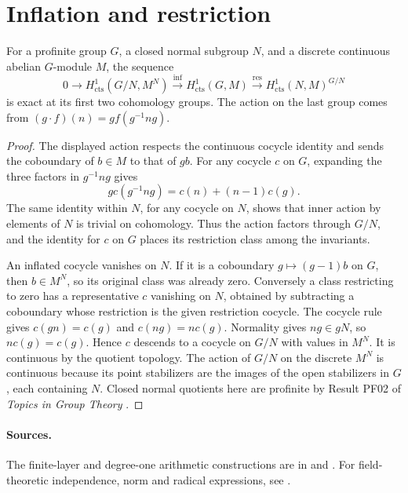 \section{Inflation and restriction}

\begin{proposition}
\label{res:GH14}
For a profinite group \(G\), a closed normal subgroup \(N\), and a
discrete continuous abelian \(G\)-module \(M\), the sequence
\[
 0\longrightarrow H^1_{\mathrm{cts}}(G/N,M^N)
 \xrightarrow{\mathrm{inf}} H^1_{\mathrm{cts}}(G,M)
 \xrightarrow{\mathrm{res}} H^1_{\mathrm{cts}}(N,M)^{G/N}
\]
is exact at its first two cohomology groups. The action on the last
group comes from \((g\cdot f)(n)=g f(g^{-1}ng)\).
\end{proposition}
\begin{proof}
The displayed action respects the continuous cocycle identity
and sends the coboundary of \(b\in M\) to that of \(gb\).
For any cocycle \(c\) on \(G\), expanding the three factors in
\(g^{-1}ng\) gives
\[
 g c(g^{-1}ng)=c(n)+(n-1)c(g).
\]
The same identity within \(N\), for any cocycle on \(N\), shows
that inner action by elements of \(N\) is trivial on cohomology.
Thus the action factors through \(G/N\), and the identity for
\(c\) on \(G\) places its restriction class among the invariants.

An inflated cocycle vanishes on \(N\). If it is a coboundary
\(g\mapsto(g-1)b\) on \(G\), then \(b\in M^N\), so its original
class was already zero. Conversely a class restricting to zero
has a representative \(c\) vanishing on \(N\), obtained by subtracting
a coboundary whose restriction is the given restriction cocycle.
The cocycle rule gives \(c(gn)=c(g)\) and \(c(ng)=n c(g)\).
Normality gives \(ng\in gN\), so \(n c(g)=c(g)\). Hence \(c\)
descends to a cocycle on \(G/N\) with values in \(M^N\).
It is continuous by the quotient topology. The action of \(G/N\)
on the discrete \(M^N\) is continuous because its point stabilizers
are the images of the open stabilizers in \(G\), each containing
\(N\). Closed normal quotients here are profinite by Result PF02
of \emph{Topics in Group Theory} \cite[PDF pp.~15--16]{mg-groups}.
\end{proof}

\paragraph{Sources.}
The finite-layer and degree-one arithmetic constructions are in
\cite[Sections 2.2, 2.4--2.5]{sharifi} and
\cite[Chapter~I, Sections 2--3 and 5]{serregc}.
For field-theoretic independence, norm and radical expressions,
see \cite[Chapter~5]{milneft}.
